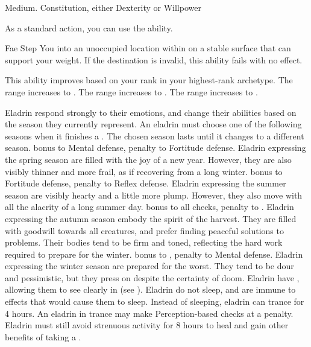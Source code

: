          Medium.
          Constitution, either  Dexterity or  Willpower
        \begin{raggeditemize}
             As a standard action, you can use the  ability.
            \begin{freeability}{Fae Step}
                You  into an unoccupied location within \shortrange on a stable surface that can support your weight.
                If the destination is invalid, this ability fails with no effect.

                \rankline
                This ability improves based on your rank in your highest-rank archetype.
                 The range increases to \medrange.
                 The range increases to \longrange.
                 The range increases to \distrange.
            \end{freeability}
             Eladrin respond strongly to their emotions, and change their abilities based on the season they currently represent.
                An eladrin must choose one of the following seasons when it finishes a .
                The chosen season lasts until it changes to a different season.
                  bonus to Mental defense,  penalty to Fortitude defense.
                Eladrin expressing the spring season are filled with the joy of a new year.
                However, they are also visibly thinner and more frail, as if recovering from a long winter.
                  bonus to Fortitude defense,  penalty to Reflex defense.
                Eladrin expressing the summer season are visibly hearty and a little more plump.
                However, they also move with all the alacrity of a long summer day.
                  bonus to all checks,  penalty to .
                Eladrin expressing the autumn season embody the spirit of the harvest.
                They are filled with goodwill towards all creatures, and prefer finding peaceful solutions to problems.
                Their bodies tend to be firm and toned, reflecting the hard work required to prepare for the winter.
                  bonus to ,  penalty to Mental defense.
                Eladrin expressing the winter season are prepared for the worst.
                They tend to be dour and pessimistic, but they press on despite the certainty of doom.
             Eladrin have , allowing them to see clearly in  (see ).
             Eladrin do not sleep, and are immune to  effects that would cause them to sleep.
                Instead of sleeping, eladrin can trance for 4 hours.
                An eladrin in trance may make Perception-based checks at a  penalty.
                Eladrin must still avoid strenuous activity for 8 hours to heal and gain other benefits of taking a .
        \end{raggeditemize}
